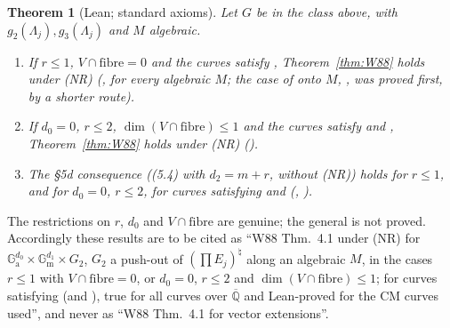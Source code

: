 \documentclass[11pt]{amsart}
\newtheorem{theorem}{Theorem}[section]
\theoremstyle{definition}
\theoremstyle{remark}
\numberwithin{equation}{section}
\newcommand{\Qbar}{\overline{\mathbb{Q}}}
\newcommand{\Ga}{\mathbb{G}_{\mathrm{a}}}
\newcommand{\Gm}{\mathbb{G}_{\mathrm{m}}}
\newcommand{\NR}{\textup{(NR)}}
\begin{document}
\begin{theorem}[Lean; standard axioms]\label{thm:vec}
Let $G$ be in the class above, with $g_2(\Lambda_j),g_3(\Lambda_j)$ and $M$ algebraic.
\begin{enumerate}
\item[(a)] If $r\le1$, $V\cap\text{fibre}=0$ and the curves satisfy , Theorem~\ref{thm:W88}
holds under \NR{} (, for every algebraic $M$; the case of onto $M$,
, was proved first, by a shorter route).
\item[(b)] If $d_0=0$, $r\le2$, $\dim(V\cap\text{fibre})\le1$ and the curves satisfy  and
, Theorem~\ref{thm:W88} holds under \NR{} ().
\item[(c)] The \S5d consequence ((5.4) with $d_2=m+r$, without \NR) holds for $r\le1$, and for $d_0=0$,
$r\le2$, for curves satisfying  and 
(, ).
\end{enumerate}
\end{theorem}

The restrictions on $r$, $d_0$ and $V\cap\text{fibre}$ are genuine; the general  is not
proved. Accordingly these results are to be cited as ``W88 Thm.~4.1 under \NR{} for
$\Ga^{d_0}\times\Gm^{d_1}\times G_2$, $G_2$ a push-out of $(\prod E_j)^\natural$ along an algebraic $M$, in the
cases $r\le1$ with $V\cap\text{fibre}=0$, or $d_0=0$, $r\le2$ and $\dim(V\cap\text{fibre})\le1$; for curves
satisfying  (and ), true for all curves over $\Qbar$ and Lean-proved for the
CM curves used'', and never as ``W88 Thm.~4.1 for vector extensions''.
\end{document}
